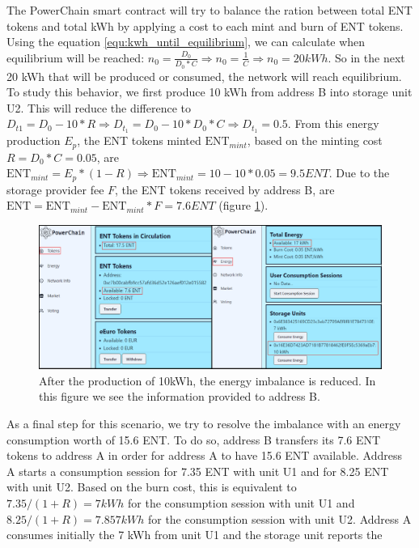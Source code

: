 The PowerChain smart contract will try to balance the ration between total ENT tokens and total kWh by applying a cost to each mint and burn of ENT tokens. Using the equation \ref{equ:kwh_until_equilibrium}, we can calculate when
equilibrium will be reached:
\begin{math}
    n_0 = \frac{D_0}{D_0*C} \Rightarrow n_0 = \frac{1}{C} \Rightarrow n_0 = 20 kWh
\end{math}.
So in the next 20 kWh that will be produced or consumed, the network will reach equilibrium. To study this behavior, we first produce 10 kWh from address B into storage unit U2.
This will reduce the difference to $D_{t1} = D_0 - 10*R \Rightarrow D_{t_1} = D_0 - 10*D_0*C \Rightarrow D_{t_1} = 0.5$. From this energy production $E_p$, the ENT tokens minted $\textrm{ENT}_{mint}$, based on the
minting cost $R=D_0*C=0.05$, are $\textrm{ENT}_{mint}=E_p*(1-R) \Rightarrow \textrm{ENT}_{mint}=10-10*0.05=9.5 ENT$. Due to the storage provider fee $F$, the ENT tokens received by
address B, are $\textrm{ENT} = \textrm{ENT}_{mint} - \textrm{ENT}_{mint} * F = 7.6 ENT$ (figure \ref{fig:reduce_imbalance}).\\
\begin{figure}[h!]
    \centering
    \includegraphics[width=\linewidth,frame,scale=1]{Figures/reduce_imbalance.png}
    \caption{After the production of 10kWh, the energy imbalance is reduced. In this figure we see the information provided to address B.}
    \label{fig:reduce_imbalance}
\end{figure}
As a final step for this scenario, we try to resolve the imbalance with an energy consumption worth of 15.6 ENT. To do so, address B transfers
its 7.6 ENT tokens to address A in order for address A to have 15.6 ENT available. Address A starts a consumption session for 7.35 ENT with unit U1 
and for 8.25 ENT with unit U2. Based on the burn cost, this is equivalent to $7.35/(1+R) = 7 kWh$ for the consumption session with unit U1 and 
$8.25/(1+R) = 7.857 kWh$ for the consumption session with unit U2. Address A consumes initially the 7 kWh from unit U1 and the storage unit reports the
